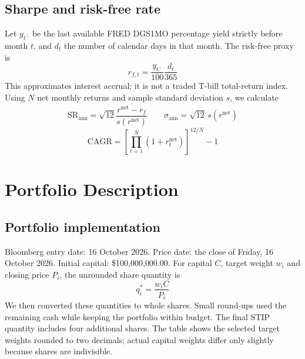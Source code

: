 \documentclass[10pt,a4paper]{article}
\begin{document}
\subsection{Sharpe and risk-free rate}
Let $y_{t^-}$ be the last available FRED DGS1MO percentage yield strictly before month $t$, and $d_t$ the number of calendar days in that month. The risk-free proxy is
\[
r_{f,t}=\frac{y_{t^-}}{100}\frac{d_t}{365}
\]
This approximates interest accrual; it is not a traded T-bill total-return index. Using $N$ net monthly returns and sample standard deviation $s$, we calculate
\[
\mathrm{SR}_{\mathrm{ann}}=\sqrt{12}\frac{\overline{r^{\mathrm{net}}-r_f}}{s(r^{\mathrm{net}})}
\qquad
\sigma_{\mathrm{ann}}=\sqrt{12}\,s(r^{\mathrm{net}})
\]
\[
\mathrm{CAGR}=\left[\prod_{t=1}^{N}(1+r^{\mathrm{net}}_t)\right]^{12/N}-1
\]


\clearpage
\section{Portfolio Description}\label{sec:portfolio}


\subsection{Portfolio implementation}
Bloomberg entry date: 16 October 2026. Price date: the close of Friday, 16 October 2026. Initial capital: \$100{,}000{,}000.00.
For capital $C$, target weight $w_i$ and closing price $P_i$, the unrounded share quantity is
\[
q_i^*=\frac{w_i C}{P_i}
\]
We then converted these quantities to whole shares. Small round-ups used the remaining cash while keeping the portfolio within budget. The final STIP quantity includes four additional shares. The table shows the selected target weights rounded to two decimals; actual capital weights differ only slightly because shares are indivisible.
\end{document}
